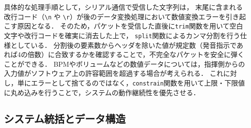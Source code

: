 \documentclass[lualatex,book,paper=a4paper,jafontsize=11.5pt,jafontscale=1.05]{jlreq}
\begin{document}
具体的な処理手順として，シリアル通信で受信した文字列は，
末尾に含まれる改行コード（\texttt{\textbackslash n} や \texttt{\textbackslash r}）が後のデータ変換処理において数値変換エラーを引き起こす原因となる．
そのため，パケットを受信した直後に\texttt{trim}関数を用いて空白文字や改行コードを確実に消去した上で，
\texttt{split}関数によるカンマ分割を行う仕様としている．
分割後の要素数からヘッダを除いた値が規定数（発音指示であれば4の倍数）に合致するかを確認することで，不完全なパケットを安全に弾くことができる．
BPMやボリュームなどの数値データについては，指揮側からの入力値がソフトウェア上の許容範囲を超過する場合が考えられる．
これに対し，単にエラーとして捨てるのではなく，\texttt{constrain}関数を用いて上限・下限値に丸め込みを行うことで，システムの動作継続性を優先させる．



\subsection{システム統括とデータ構造}
\end{document}
